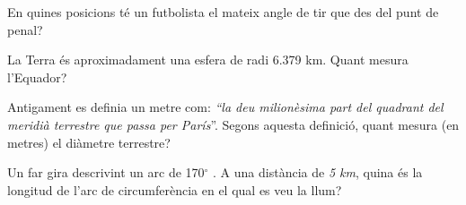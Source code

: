 \begin{mylist}

\exer  En quines posicions té un futbolista el mateix angle de tir que des del punt de penal?

 


\exer  La Terra és aproximadament una esfera de radi 6.379 km. Quant mesura l'Equador?

\exer  Antigament es definia un metre com: \textit{``la deu milionèsima part del quadrant del meridià terrestre que passa per París}''. Segons aquesta definició, quant mesura (en metres) el diàmetre terrestre? 

\exer   Un far gira descrivint un arc de 170${}^\circ$ . A una distància de \textit{5 km}, quina és la longitud de l'arc de circumferència en el qual es veu la llum?


\end{mylist}
